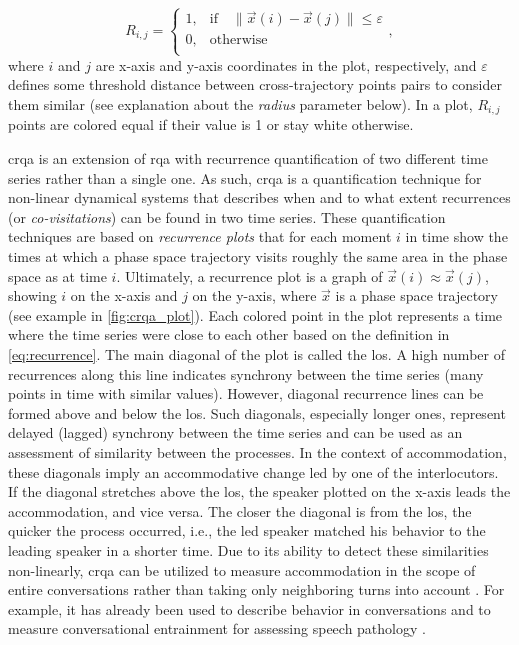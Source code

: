\begin{equation}
	\label{eq:recurrence}
	R_{i,j} =
	\begin{cases}
		1,	&	\text{if} \quad \lVert \vec{x}(i)-\vec{x}(j) \rVert \leq \varepsilon \\
		0,	&	\text{otherwise} \\
	\end{cases},
\end{equation}
%
where $i$ and $j$ are x-axis and y-axis coordinates in the plot, respectively, and $\varepsilon$ defines some threshold distance between cross-trajectory points pairs to consider them similar (see explanation about the \emph{radius} parameter below).
In a plot, $R_{i,j}$ points are colored equal if their value is 1 or stay white otherwise.

\Acf{crqa} is an extension of \ac{rqa} with recurrence quantification of two different time series rather than a single one.
As such, \ac{crqa} is a quantification technique for non-linear dynamical systems that describes when and to what extent recurrences (or \emph{co-visitations}) can be found in two time series.
These quantification techniques are based on \emph{recurrence plots} that for each moment $i$ in time show the times at which a phase space trajectory visits roughly the same area in the phase space as at time $i$.
Ultimately, a recurrence plot is a graph of $\vec{x}(i) \approx \vec{x}(j)$, showing $i$ on the x-axis and $j$ on the y-axis, where $\vec{x}$ is a phase space trajectory (see example in \cref{fig:crqa_plot}).
Each colored point in the plot represents a time where the time series were close to each other based on the definition in \cref{eq:recurrence}.
The main diagonal of the plot is called the \acf{los}.
A high number of recurrences along this line indicates synchrony between the time series (many points in time with similar values).
However, diagonal recurrence lines can be formed above and below the \ac{los}.
Such diagonals, especially longer ones, represent delayed (lagged) synchrony between the time series and can be used as an assessment of similarity between the processes.
In the context of accommodation, these diagonals imply an accommodative change led by one of the interlocutors.
If the diagonal stretches above the \ac{los}, the speaker plotted on the x-axis leads the accommodation, and vice versa.
The closer the diagonal is from the \ac{los}, the quicker the process occurred, i.e., the led speaker matched his behavior to the leading speaker in a shorter time.
Due to its ability to detect these similarities non-linearly, \ac{crqa} can be utilized to measure accommodation in the scope of entire conversations rather than taking only neighboring turns into account \citep[cf.][]{Levitan2013entrainment}.
For example, it has already been used to describe behavior in conversations \citep{Duran2017conversing} and to measure conversational entrainment for assessing speech pathology \citep{Borrie2019syncing}.

